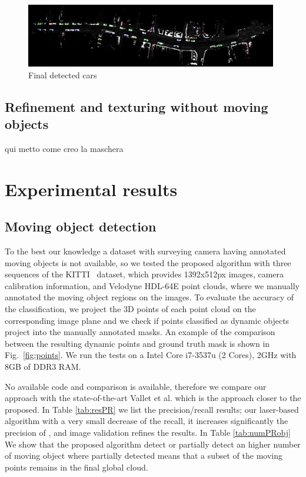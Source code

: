 \begin{figure}[tp]
 \centering
 \includegraphics[width=0.98\textwidth]{./img/ch-laser/drawing.png}
 \caption{Final detected cars}
 \label{fig:drawing}
\end{figure}



\cite{tanner2016lies}
\cite{cornelis_et_al08}
\subsection{Refinement and texturing without moving objects}

qui metto come creo la maschera
\section{Experimental results}%
\label{sec:experiments}

\subsection{Moving object detection}
To the best our knowledge a dataset with surveying camera having annotated moving objects is not available, so we tested the proposed algorithm with three sequences of the KITTI~\cite{Kitti} dataset, which provides 1392x512px images, camera calibration information, and Velodyne HDL-64E point clouds, where we manually annotated the moving object regions on the images. To evaluate the accuracy of the classification, we project the 3D points of each point cloud on the corresponding image plane and we check if points classified as dynamic objects project into the manually annotated masks. An example of the comparison between the resulting dynamic points and ground truth mask is shown in Fig.~\ref{fig:points}.
We run the tests on a  Intel Core i7-3537u (2 Cores), 2GHz with 8GB of DDR3 RAM. 

No available code and comparison is available, therefore we compare our approach with the state-of-the-art Vallet et al. \cite{vallet2015extracting} which is the approach closer to the proposed.
In Table \ref{tab:resPR} we list the precision/recall results; our laser-based algorithm with a very small decrease of the recall, it increases significantly the precision of \cite{vallet2015extracting}, and image validation refines the results.
In Table \ref{tab:numPRobj} We show that the proposed algorithm detect or partially detect an higher number of moving object where  partially detected means that a subset of the moving points remains in the final global cloud.

